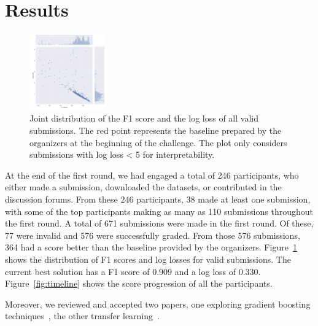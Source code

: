 \documentclass[sigconf]{acmart}
\begin{document}
\section{Results}


\begin{figure}[t]
\centering
\includegraphics[width=\linewidth,height=3.3cm]{images/plot-1}
\caption{Joint distribution of the F1 score and the log loss of all valid submissions. The red point represents the baseline prepared by the organizers at the beginning of the challenge. The plot only considers submissions with log loss < 5 for interpretability.}
\label{fig:jointplot}
\end{figure}


At the end of the first round, we had engaged a total of 246 participants, who either made a submission, downloaded the datasets, or contributed in the discussion forums. From these 246 participants, 38 made at least one submission, with some of the top participants making as many as 110 submissions throughout the first round.
A total of 671 submissions were made in the first round. Of these, 77 were invalid and 576 were successfully graded.
From those 576 submissions, 364 had a score better than the baseline provided by the organizers. Figure~\ref{fig:jointplot} shows the distribution of F1 scores and log losses for valid submissions.
The current best solution has a F1 score of $0.909$ and a log loss of $0.330$. %
Figure~\ref{fig:timeline} shows the score progression of all the participants.

Moreover, we reviewed and accepted two papers, one exploring gradient boosting techniques~\cite{gradient_boosting}, the other transfer learning~\cite{transfer_learning}.
\end{document}
